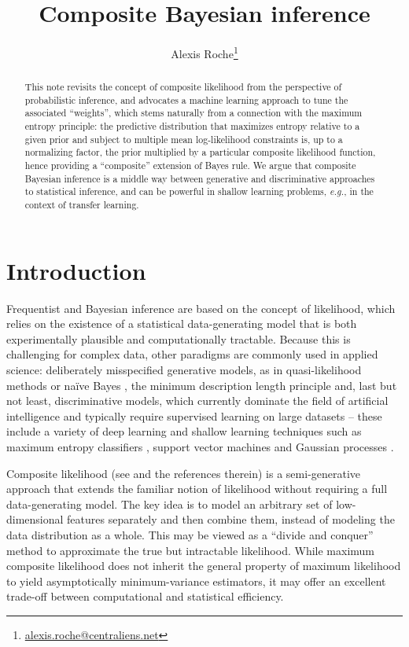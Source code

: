 \documentclass[english]{scrartcl}
\title{Composite Bayesian inference}
\date{}
\author{Alexis Roche\thanks{\url{alexis.roche@centraliens.net}}}
\begin{document}
\maketitle

\begin{abstract}
This note revisits the concept of composite likelihood from the perspective of probabilistic inference, and advocates a machine learning approach to tune the associated ``weights'', which stems naturally from a connection with the maximum entropy principle: the predictive distribution that maximizes entropy relative to a given prior and subject to multiple mean log-likelihood constraints is, up to a normalizing factor, the prior multiplied by a particular composite likelihood function, hence providing a ``composite'' extension of Bayes rule. We argue that composite Bayesian inference is a middle way between generative and discriminative approaches to statistical inference, and can be powerful in shallow learning problems, {\em e.g.}, in the context of transfer learning.
\end{abstract}


\section{Introduction}
\label{sec:intro}

Frequentist and Bayesian inference are based on the concept of likelihood, which relies on the existence of a statistical data-generating model that is both experimentally plausible and computationally tractable. Because this is challenging for complex data, other paradigms are commonly used in applied science: deliberately misspecified generative models, as in quasi-likelihood methods \cite{White-82,Walker-13} or na\"ive Bayes \cite{Ng-01}, the minimum description length principle \cite{Grunwald-07} and, last but not least, discriminative models, which currently dominate the field of artificial intelligence and typically require supervised learning on large datasets -- these include a variety of deep learning \cite{Lecun-15,Goodfellow-16} and shallow learning techniques such as maximum entropy classifiers \cite{BergerA-96}, support vector machines \cite{Vapnik-00} and Gaussian processes \cite{Rasmussen-06}.

Composite likelihood (see \cite{Varin-11} and the references therein) is a semi-generative approach that extends the familiar notion of likelihood without requiring a full data-generating model. The key idea is to model an arbitrary set of low-dimensional features separately and then combine them, instead of modeling the data distribution as a whole. This may be viewed as a ``divide and conquer'' method to approximate the true but intractable likelihood. While maximum composite likelihood does not inherit the general property of maximum likelihood to yield asymptotically minimum-variance estimators, it may offer an excellent trade-off between computational and statistical efficiency.
\end{document}
